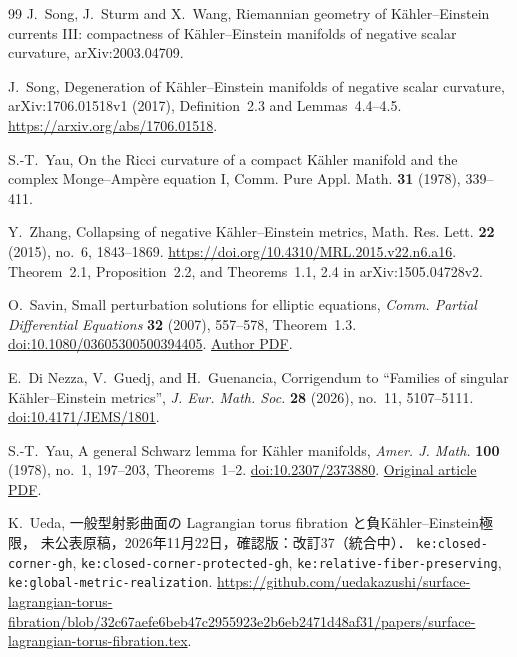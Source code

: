 \documentclass[a4paper,11pt]{ltjsarticle}
\numberwithin{equation}{section}
\theoremstyle{plain}
\theoremstyle{definition}
\theoremstyle{remark}
\begin{document}
\begin{thebibliography}{99}
J.~Song, J.~Sturm and X.~Wang,
\newblock Riemannian geometry of K\"ahler--Einstein currents III: compactness of K\"ahler--Einstein manifolds of negative scalar curvature,
\newblock arXiv:2003.04709.

J.~Song,
\newblock Degeneration of Kähler--Einstein manifolds of negative scalar curvature,
\newblock arXiv:1706.01518v1 (2017), Definition~2.3 and Lemmas~4.4--4.5.
\newblock \url{https://arxiv.org/abs/1706.01518}.

S.-T.~Yau,
\newblock On the Ricci curvature of a compact K\"ahler manifold and the complex Monge--Amp\`ere equation I,
\newblock Comm. Pure Appl. Math. \textbf{31} (1978), 339--411.

Y.~Zhang,
\newblock Collapsing of negative Kähler--Einstein metrics,
\newblock Math. Res. Lett. \textbf{22} (2015), no.~6, 1843--1869.
\newblock \url{https://doi.org/10.4310/MRL.2015.v22.n6.a16}.
\newblock Theorem~2.1, Proposition~2.2, and Theorems~1.1, 2.4 in arXiv:1505.04728v2.


O.~Savin,
Small perturbation solutions for elliptic equations,
\emph{Comm. Partial Differential Equations} \textbf{32} (2007), 557--578,
Theorem~1.3.
\href{https://doi.org/10.1080/03605300500394405}{doi:10.1080/03605300500394405}.
\href{https://www.math.columbia.edu/~savin/Small_pert.pdf}{Author PDF}.

E.~Di Nezza, V.~Guedj, and H.~Guenancia,
Corrigendum to ``Families of singular K\"ahler--Einstein metrics'',
\emph{J. Eur. Math. Soc.} \textbf{28} (2026), no.~11, 5107--5111.
\href{https://doi.org/10.4171/JEMS/1801}{doi:10.4171/JEMS/1801}.


S.-T.~Yau,
A general Schwarz lemma for K\"ahler manifolds,
\emph{Amer. J. Math.} \textbf{100} (1978), no.~1, 197--203,
Theorems~1--2.
\href{https://doi.org/10.2307/2373880}{doi:10.2307/2373880}.
\href{https://archive.ymsc.tsinghua.edu.cn/pacm_download/59/11034-Shing-Tung_Yau_30.pdf}{Original article PDF}.

K.~Ueda,
\newblock 一般型射影曲面の Lagrangian torus fibration と負Kähler--Einstein極限，
\newblock 未公表原稿，2026年11月22日，確認版：改訂37（統合中）．
\newblock \texttt{ke:closed-corner-gh}, \texttt{ke:closed-corner-protected-gh},
\texttt{ke:relative-fiber-preserving}, \texttt{ke:global-metric-realization}.
\newblock \url{https://github.com/uedakazushi/surface-lagrangian-torus-fibration/blob/32c67aefe6beb47c2955923e2b6eb2471d48af31/papers/surface-lagrangian-torus-fibration.tex}.

\end{thebibliography}
\end{document}
